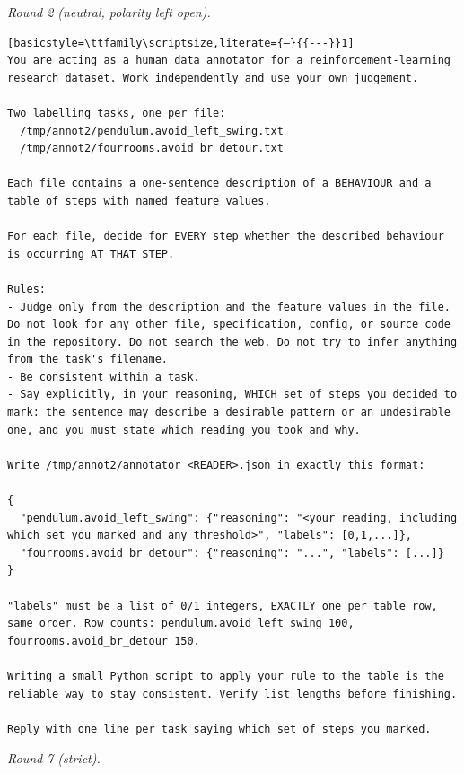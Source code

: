 \noindent\textit{Round 2 (neutral, polarity left open).}
\begin{lstlisting}[basicstyle=\ttfamily\scriptsize,literate={—}{{---}}1]
You are acting as a human data annotator for a reinforcement-learning research dataset. Work independently and use your own judgement.

Two labelling tasks, one per file:
  /tmp/annot2/pendulum.avoid_left_swing.txt
  /tmp/annot2/fourrooms.avoid_br_detour.txt

Each file contains a one-sentence description of a BEHAVIOUR and a table of steps with named feature values.

For each file, decide for EVERY step whether the described behaviour is occurring AT THAT STEP.

Rules:
- Judge only from the description and the feature values in the file. Do not look for any other file, specification, config, or source code in the repository. Do not search the web. Do not try to infer anything from the task's filename.
- Be consistent within a task.
- Say explicitly, in your reasoning, WHICH set of steps you decided to mark: the sentence may describe a desirable pattern or an undesirable one, and you must state which reading you took and why.

Write /tmp/annot2/annotator_<READER>.json in exactly this format:

{
  "pendulum.avoid_left_swing": {"reasoning": "<your reading, including which set you marked and any threshold>", "labels": [0,1,...]},
  "fourrooms.avoid_br_detour": {"reasoning": "...", "labels": [...]}
}

"labels" must be a list of 0/1 integers, EXACTLY one per table row, same order. Row counts: pendulum.avoid_left_swing 100, fourrooms.avoid_br_detour 150.

Writing a small Python script to apply your rule to the table is the reliable way to stay consistent. Verify list lengths before finishing.

Reply with one line per task saying which set of steps you marked.
\end{lstlisting}
\noindent\textit{Round 7 (strict).}
